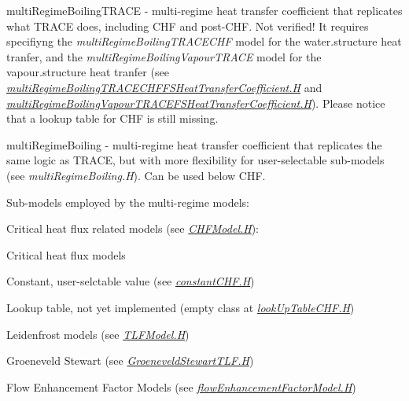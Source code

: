 \begin{DoxyItemize}
\begin{DoxyItemize}
\item multi\+Regime\+Boiling\+T\+R\+A\+CE -\/ multi-\/regime heat transfer coefficient that replicates what T\+R\+A\+CE does, including C\+HF and post-\/\+C\+HF. Not verified! It requires specifiyng the {\itshape multi\+Regime\+Boiling\+T\+R\+A\+C\+E\+C\+HF} model for the water.\+structure heat tranfer, and the {\itshape multi\+Regime\+Boiling\+Vapour\+T\+R\+A\+CE} model for the vapour.\+structure heat tranfer (see {\itshape \hyperlink{multiRegimeBoilingTRACECHFFSHeatTransferCoefficient_8H}{multi\+Regime\+Boiling\+T\+R\+A\+C\+E\+C\+H\+F\+F\+S\+Heat\+Transfer\+Coefficient.\+H}} and {\itshape \hyperlink{multiRegimeBoilingVapourTRACEFSHeatTransferCoefficient_8H}{multi\+Regime\+Boiling\+Vapour\+T\+R\+A\+C\+E\+F\+S\+Heat\+Transfer\+Coefficient.\+H}}). Please notice that a lookup table for C\+HF is still missing. 
\item multi\+Regime\+Boiling -\/ multi-\/regime heat transfer coefficient that replicates the same logic as T\+R\+A\+CE, but with more flexibility for user-\/selectable sub-\/models (see {\itshape multi\+Regime\+Boiling.\+H}). Can be used below C\+HF. 
\item Sub-\/models employed by the multi-\/regime models\+: 
\begin{DoxyItemize}
\item Critical heat flux related models (see {\itshape \hyperlink{CHFModel_8H}{C\+H\+F\+Model.\+H}})\+: 
\begin{DoxyItemize}
\item Critical heat flux models 
\begin{DoxyItemize}
\item Constant, user-\/selctable value (see {\itshape \hyperlink{constantCHF_8H}{constant\+C\+H\+F.\+H}}) 
\item Lookup table, not yet implemented (empty class at {\itshape \hyperlink{lookUpTableCHF_8H}{look\+Up\+Table\+C\+H\+F.\+H}}) 
\end{DoxyItemize}
\item Leidenfrost models (see {\itshape \hyperlink{TLFModel_8H}{T\+L\+F\+Model.\+H}}) 
\begin{DoxyItemize}
\item Groeneveld Stewart (see {\itshape \hyperlink{GroeneveldStewartTLF_8H}{Groeneveld\+Stewart\+T\+L\+F.\+H}}) 
\end{DoxyItemize}
\end{DoxyItemize}
\item Flow Enhancement Factor Models (see {\itshape \hyperlink{flowEnhancementFactorModel_8H}{flow\+Enhancement\+Factor\+Model.\+H}}) 

\end{DoxyItemize}
\end{DoxyItemize}
\end{DoxyItemize}
